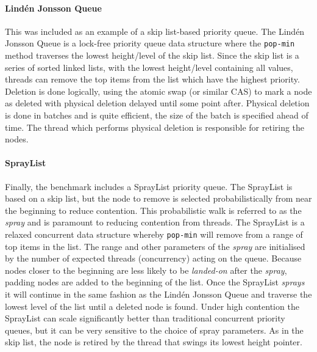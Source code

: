 \paragraph{Lind{\'e}n Jonsson Queue} This was included as an example of a skip list-based priority queue. \cite{LindenPriority} The Lind{\'e}n Jonsson Queue is a lock-free priority queue data structure where the \texttt{pop-min} method traverses the lowest height/level of the skip list. Since the skip list is a series of sorted linked lists, with the lowest height/level containing all values, threads can remove the top items from the list which have the highest priority. Deletion is done logically, using the atomic swap (or similar CAS) to mark a node as deleted with physical deletion delayed until some point after. Physical deletion is done in batches and is quite efficient, the size of the batch is specified ahead of time. The thread which performs physical deletion is responsible for retiring the nodes.

\paragraph{SprayList} Finally, the benchmark includes a SprayList priority queue.\cite{SprayList} The SprayList is based on a skip list, but the node to remove is selected probabilistically from near the beginning to reduce contention. This probabilistic walk is referred to as the \textit{spray} and is paramount to reducing contention from threads. The SprayList is a relaxed concurrent data structure whereby \texttt{pop-min} will remove from a range of top items in the list. The range and other parameters of the \textit{spray} are initialised by the number of expected threads (concurrency) acting on the queue. Because nodes closer to the beginning are less likely to be \textit{landed-on} after the \textit{spray}, padding nodes are added to the beginning of the list. Once the SprayList \textit{sprays} it will continue in the same fashion as the Lind{\'e}n Jonsson Queue and traverse the lowest level of the list until a deleted node is found. Under high contention the SprayList can scale significantly better than traditional concurrent priority queues, but it can be very sensitive to the choice of spray parameters. As in the skip list, the node is retired by the thread that swings its lowest height pointer.
